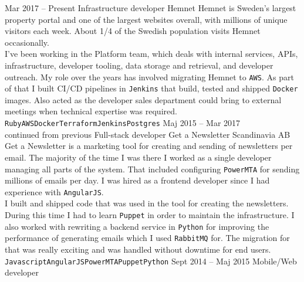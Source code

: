 \documentclass[9pt]{developercv} %
\begin{document}

\pagebreak
{}

\begin{entrylist}
  \entry
    {Mar 2017 -- Present}
    {Infrastructure developer}
    {Hemnet}
    {Hemnet is Sweden's largest property portal and one of the largest websites
      overall, with millions of unique visitors each week. About 1/4 of the
      Swedish population visits Hemnet occasionally.\\ I've been working in the
      Platform team, which deals with internal services, APIs, infrastructure,
      developer tooling, data storage and retrieval, and developer outreach. My
      role over the years has involved migrating Hemnet to \texttt{AWS}.
      As part of that I built CI/CD pipelines in \texttt{Jenkins}
      that build, tested and shipped \texttt{Docker} images.
      Also acted as the developer sales department could bring to external meetings
      when technical expertise was required.
      \texttt{Ruby}\slashsep\texttt{AWS}\slashsep\texttt{Docker}\slashsep\texttt{Terraform}\slashsep\texttt{Jenkins}\slashsep\texttt{Postgres}}
  \entry
    {Maj 2015 -- Mar 2017\\\footnotesize{continued from previous}}
    {Full-stack developer}
    {Get a Newsletter Scandinavia AB}
    {Get a Newsletter is a marketing tool for creating and sending of newsletters
      per email. The majority of the time I was there I worked as a single developer
      managing all parts of the system. That included configuring \texttt{PowerMTA}
      for sending millions of emails per day. I was hired as a frontend developer 
      since I had experience with \texttt{AngularJS}.\\ I built and shipped code 
      that was used in the tool for creating the newsletters. During this time I
      had to learn \texttt{Puppet} in order to maintain the infrastructure.
      I also worked with rewriting a backend service in \texttt{Python} for
      improving the performance of generating emails which I used \texttt{RabbitMQ} for.
      The migration for that was really exciting and was handled without downtime
      for end users.
      \texttt{Javascript}\slashsep\texttt{AngularJS}\slashsep\texttt{PowerMTA}\slashsep\texttt{Puppet}\slashsep\texttt{Python}}
  \entry
    {Sept 2014 -- Maj 2015}
    {Mobile/Web developer}

\end{entrylist}
\end{document}
